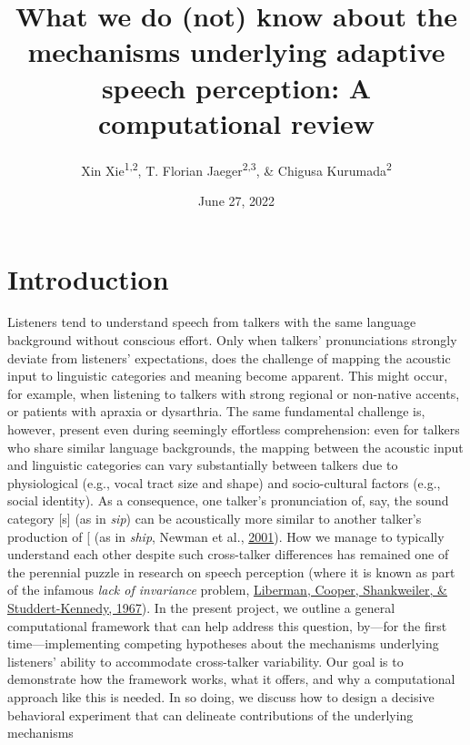 \documentclass[
  11pt,
  english,
  man,floatsintext]{apa6}
\title{What we do (not) know about the mechanisms underlying adaptive speech perception: A computational review}
\author{Xin Xie\textsuperscript{1,2}, T. Florian Jaeger\textsuperscript{2,3}, \& Chigusa Kurumada\textsuperscript{2}}
\date{June 27, 2022}
\affiliation{\vspace{0.5cm}\textsuperscript{1} Language Science, University of California, Irvine\\\textsuperscript{2} Brain and Cognitive Sciences, University of Rochester\\\textsuperscript{3} Computer Science, University of Rochester}
\begin{document}
\maketitle

\hypertarget{introduction}{%
\section{Introduction}\label{introduction}}

Listeners tend to understand speech from talkers with the same language background without conscious effort. Only when talkers' pronunciations strongly deviate from listeners' expectations, does the challenge of mapping the acoustic input to linguistic categories and meaning become apparent. This might occur, for example, when listening to talkers with strong regional or non-native accents, or patients with apraxia or dysarthria. The same fundamental challenge is, however, present even during seemingly effortless comprehension: even for talkers who share similar language backgrounds, the mapping between the acoustic input and linguistic categories can vary substantially between talkers due to physiological (e.g., vocal tract size and shape) and socio-cultural factors (e.g., social identity). As a consequence, one talker's pronunciation of, say, the sound category {[}s{]} (as in \emph{sip}) can be acoustically more similar to another talker's production of {[}\ipatext{ʃ}{]} (as in \emph{ship}, Newman et al., \protect\hyperlink{ref-newman2001}{2001}). How we manage to typically understand each other despite such cross-talker differences has remained one of the perennial puzzle in research on speech perception (where it is known as part of the infamous \emph{lack of invariance} problem, \protect\hyperlink{ref-liberman1967}{Liberman, Cooper, Shankweiler, \& Studdert-Kennedy, 1967}). In the present project, we outline a general computational framework that can help address this question, by---for the first time---implementing competing hypotheses about the mechanisms underlying listeners' ability to accommodate cross-talker variability. Our goal is to demonstrate how the framework works, what it offers, and why a computational approach like this is needed. In so doing, we discuss how to design a decisive behavioral experiment that can delineate contributions of the underlying mechanisms
\end{document}
